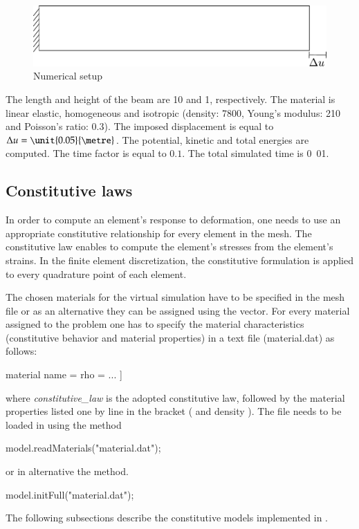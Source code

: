 \begin{figure}[!htb]
  \centering
  \includegraphics[scale=.6]{figures/explicit_dynamic}
  \caption{Numerical setup \label{fig:smm:explicit}}
\end{figure}

The length  and height of  the beam are \unit{10}{\metre}  and \unit{1}{\metre},
respectively.   The  material  is  linear  elastic,  homogeneous  and  isotropic
(density:       \unit{7800}{\kilogrampercubicmetre},       Young's      modulus:
\unit{210}{\giga\pascal} and Poisson's  ratio: $0.3$).  The imposed displacement
is equal to  $\Delta u = \unit{0.05}{\metre}$. The  potential, kinetic and
total  energies are  computed.  The  time factor  is equal  to $0.1$.  The total
simulated time is \unit{0.01}{\second}.

\subsection{Constitutive laws \label{sect:smm:CL}}
In order to compute an element's response to deformation, one needs to use an appropriate constitutive relationship for every element in the mesh. The constitutive law enables to compute the element's stresses from the element's strains. In the finite element discretization, the constitutive formulation is applied to every quadrature point of each element.

The chosen materials for the virtual simulation have to be specified in the mesh file or as an alternative they can be assigned using the  vector.
For every material assigned to the problem one has to specify the material characteristics (constitutive behavior and material properties) in a text file (\eg material.dat) as follows:
\begin{cpp}
  material %
  name = %
  rho = %
  ...
  ]
\end{cpp}
where \emph{constitutive\_law} is the adopted constitutive law, followed by the material properties listed one by line in the bracket (\eg {} and density ). The file needs to be loaded in \akantu using the  method
\begin{cpp}
  model.readMaterials("material.dat");
\end{cpp}
or in alternative the  method.
\begin{cpp}
  model.initFull("material.dat");
\end{cpp}
The following subsections describe the constitutive models implemented in \akantu.

